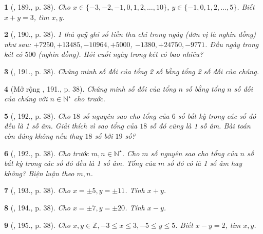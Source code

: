 \documentclass{article}
\newtheorem{baitoan}{}
\begin{document}
\begin{baitoan}[\cite{Tuyen_Toan_6}, 189., p. 38]
	Cho $x\in\{-3,-2,-1,0,1,2,\ldots,10\}$, $y\in\{-1,0,1,2,\ldots,5\}$. Biết $x + y = 3$, tìm $x,y$.
\end{baitoan}

\begin{baitoan}[\cite{Tuyen_Toan_6}, 190., p. 38]
	1 thủ quỹ ghi số tiền thu chi trong ngày (đơn vị là nghìn đồng) như sau: $+7250,+13485,-10964,+5000$, $-1380,+24750,-9771$. Đầu ngày trong két có $500$ (nghìn đồng). Hỏi cuối ngày trong két có bao nhiêu?
\end{baitoan}

\begin{baitoan}[\cite{Tuyen_Toan_6}, 191., p. 38]
	Chứng minh số đối của tổng 2 số bằng tổng 2 số đối của chúng.
\end{baitoan}

\begin{baitoan}[Mở rộng \cite{Tuyen_Toan_6}, 191., p. 38]
	Chứng minh số đối của tổng $n$ số bằng tổng $n$ số đối của chúng với $n\in\mathbb{N}^\star$ cho trước.
\end{baitoan}

\begin{baitoan}[\cite{Tuyen_Toan_6}, 192., p. 38]
	Cho $18$ số nguyên sao cho tổng của $6$ số bất kỳ trong các số đó đều là 1 số âm. Giải thích vì sao tổng của $18$ số đó cũng là 1 số âm. Bài toán còn đúng không nếu thay $18$ số bởi $19$ số?
\end{baitoan}

\begin{baitoan}[\cite{Tuyen_Toan_6}, 192., p. 38]
	Cho trước $m,n\in\mathbb{N}^\star$. Cho $m$ số nguyên sao cho tổng của $n$ số bất kỳ trong các số đó đều là 1 số âm. Tổng của $m$ số đó có là 1 số âm hay không? Biện luận theo $m,n$.
\end{baitoan}

\begin{baitoan}[\cite{Tuyen_Toan_6}, 193., p. 38]
	Cho $x = \pm5,y = \pm11$. Tính $x + y$.
\end{baitoan}

\begin{baitoan}[\cite{Tuyen_Toan_6}, 194., p. 38]
	Cho $x = \pm7,y = \pm20$. Tính $x - y$.
\end{baitoan}

\begin{baitoan}[\cite{Tuyen_Toan_6}, 195., p. 38]
	Cho $x,y\in\mathbb{Z},-3\le x\le3,-5\le y\le5$. Biết $x - y = 2$, tìm $x,y$.
\end{baitoan}
\end{document}

